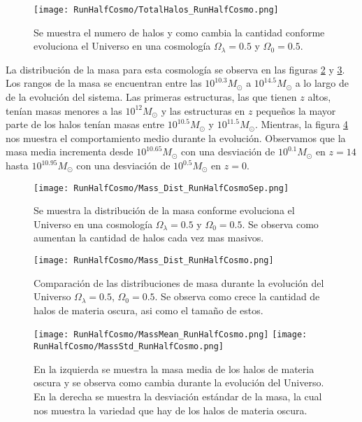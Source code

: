 \begin{figure}[H]
    \centering
    \texttt{[image: RunHalfCosmo/TotalHalos\_RunHalfCosmo.png]}
    \caption[Evolución del número de halos en un Universo $\Omega_\lambda = 0.5 $, $\Omega_0 = 0.5$]{\footnotesize Se muestra el numero de halos y como cambia la cantidad conforme evoluciona el Universo en una cosmología $\Omega_\lambda = 0.5 $ y $\Omega_0 = 0.5$.}    
    \label{fig:HalfCosmo-TotalHalos}
\end{figure}

La distribución de la masa para esta cosmología se observa en las figuras \ref{fig:HalfCosmo-MassDistSep} y \ref{fig:HalfCosmo-MassDist}. Los rangos de la masa se encuentran entre las $10^{10.3}M_\odot$ a $10^{14.5}M_\odot$ a lo largo de de la evolución del sistema. Las primeras estructuras, las que tienen $z$ altos, tenían masas menores a las $10^{12}M_\odot$ y las estructuras en $z$ pequeños la mayor parte de los halos tenían masas entre $10^{10.5}M_\odot$ y $10^{11.5}M_\odot$. Mientras, la figura \ref{fig:HalfCosmo-MassStats} nos muestra el comportamiento medio durante la evolución. Observamos que la masa media incrementa desde $10^{10.65}M_\odot$ con una desviación de $10^{0.1}M_\odot$ en $z=14$ hasta $10^{10.95}M_\odot$ con una desviación de $10^{0.5}M_\odot$ en $z=0$.

\begin{figure}[H]
    \centering
    \texttt{[image: RunHalfCosmo/Mass\_Dist\_RunHalfCosmoSep.png]}
    \caption[Distribución de masa]{\footnotesize Se muestra la distribución de la masa conforme evoluciona el Universo en una cosmología $\Omega_\lambda = 0.5$ y $\Omega_0 = 0.5$. Se observa como aumentan la cantidad de halos cada vez mas masivos.}
    \label{fig:HalfCosmo-MassDistSep}
\end{figure}

\begin{figure}[H]
    \centering
    \texttt{[image: RunHalfCosmo/Mass\_Dist\_RunHalfCosmo.png]}
    \caption[Comparación de distribución de masa Universo]{\footnotesize Comparación de las distribuciones de masa durante la evolución del Universo $\Omega_\lambda = 0.5$, $\Omega_0 = 0.5$. Se observa como crece la cantidad de halos de materia oscura, asi como el tamaño de estos.}
    \label{fig:HalfCosmo-MassDist}
\end{figure}

\begin{figure}[H]
    \centering
    \texttt{[image: RunHalfCosmo/MassMean\_RunHalfCosmo.png]}
    \texttt{[image: RunHalfCosmo/MassStd\_RunHalfCosmo.png]}
    \caption[Media y desviación estándar de la distribución de masa]{\footnotesize En la izquierda se muestra la masa media de los halos de materia oscura y se observa como cambia durante la evolución del Universo. En la derecha se muestra la desviación estándar de la masa, la cual nos muestra la variedad que hay de los halos de materia oscura.}
    \label{fig:HalfCosmo-MassStats}
\end{figure}

